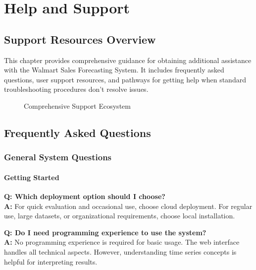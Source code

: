%
%
%



\chapter{Help and Support}

\section{Support Resources Overview}

This chapter provides comprehensive guidance for obtaining additional assistance with the Walmart Sales Forecasting System. It includes frequently asked questions, user support resources, and pathways for getting help when standard troubleshooting procedures don't resolve issues.

\begin{figure}[H]
    \centering
    
    \caption{Comprehensive Support Ecosystem}
    \label{fig:support_ecosystem}
\end{figure}

\section{Frequently Asked Questions}

\subsection{General System Questions}

\subsubsection{Getting Started}

\textbf{Q: Which deployment option should I choose?}\\
\textbf{A:} For quick evaluation and occasional use, choose cloud deployment. For regular use, large datasets, or organizational requirements, choose local installation.

\textbf{Q: Do I need programming experience to use the system?}\\
\textbf{A:} No programming experience is required for basic usage. The web interface handles all technical aspects. However, understanding time series concepts is helpful for interpreting results.

